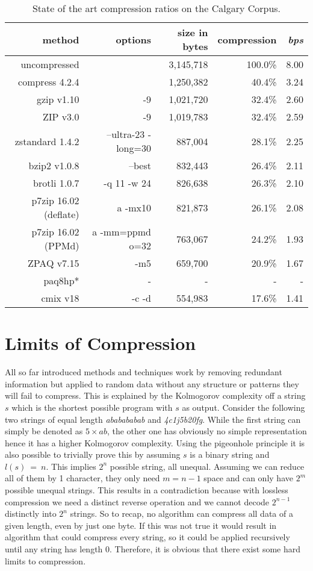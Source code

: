 {	\begin{table}[h]
		\begin{tabular}{r|r|r|r|r}
			method & options &  size in bytes & compression & \textit{bps}\\
			\hline
			uncompressed & & 3,145,718 & 100.0\% & 8.00 \\
			compress 4.2.4 & & 1,250,382 & 40.4\% & 3.24 \\
			gzip v1.10 & -9 & 1,021,720 & 32.4\% & 2.60\\
			ZIP v3.0 &-9& 1,019,783 & 32.4\% & 2.59 \\
			zstandard 1.4.2& --ultra-23 -long=30 & 887,004 & 28.1\% & 2.25\\
			bzip2 v1.0.8 & --best & 832,443 & 26.4\% & 2.11 \\
			brotli 1.0.7 & -q 11 -w 24 & 826,638 & 26.3\%& 2.10\\
			p7zip 16.02 (deflate) & a -mx10 & 821,873 & 26.1\% & 2.08 \\
			p7zip 16.02 (PPMd) & a -mm=ppmd o=32 & 763,067& 24.2\% & 1.93 \\
			ZPAQ v7.15 & -m5 & 659,700 & 20.9\% & 1.67  \\
			paq8hp* & - & - & - & - \\
			cmix v18 & -c -d & 554,983 & 17.6\% & 1.41 		
		\end{tabular}
				\label{tab:t20 stat of the art}
			\caption{State of the art compression ratios on the Calgary Corpus.}
	\end{table}
}

\section{Limits of Compression}
\label{ch:Principles of compression:sec:Limits of Conpression}
\par{
All so far introduced methods and techniques work by removing redundant information but applied to random data without any structure or patterns they will fail to compress. This is explained by the Kolmogorov complexity\cite{kolmogorov} off a string $s$ which is the shortest possible program with $s$ as output. Consider the following two strings of equal length \textit{ababababab} and \textit{4c1j5b20fg}. While the first string can simply be denoted as $5 \times ab$, the other one has obviously no simple representation hence it has a higher Kolmogorov complexity. Using the pigeonhole principle it is also possible to trivially prove this by assuming $s$ is a binary string and $l(s) \: = \: n$. This implies $2^n$ possible string, all unequal. Assuming we can reduce all of them by 1 character, they only need $m = n - 1$ space and can only have $2^m$ possible unequal strings. This results in a contradiction because with lossless compression we need a distinct reverse operation and we cannot decode $2^{n-1}$ distinctly into $2^n$ strings. So to recap, no algorithm can compress all data of a given length, even by just one byte. If this was not true it would result in algorithm that could compress every string, so it could be applied recursively until any string has length 0. Therefore, it is obvious that there exist some hard limits to compression.
}
